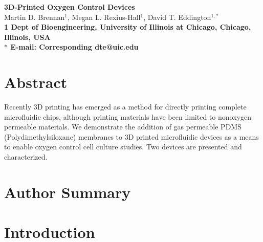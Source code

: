 \date{}

\pagestyle{myheadings}







\begin{flushleft}
{\Large
\textbf{3D-Printed Oxygen Control Devices}
}
\\
Martin D. Brennan$^{1}$, 
Megan L. Rexius-Hall$^{1}$, 
David T. Eddington$^{1,\ast}$
\\
\bf{1} Dept of Bioengineering, University of Illinois at Chicago, Chicago, Illinois, USA
\\
$\ast$ E-mail: Corresponding dte@uic.edu
\end{flushleft}

\section*{Abstract}

Recently 3D printing has emerged as a method for directly printing complete microfluidic chips, 
although printing materials have been limited to non­oxygen permeable materials.
We demonstrate the addition of gas permeable PDMS (Polydimethylsiloxane) membranes to 3D printed microfluidic devices as a means to enable oxygen control cell culture studies.
Two devices are presented and characterized.


\section*{Author Summary}



\section*{Introduction}


